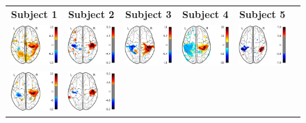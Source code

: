 \begin{figure}[hb]
\scriptsize
\hspace{-4ex}
\begin{tabular}{cccccl}
\textbf{\Large Subject 1} & \textbf{\Large Subject 2} & \textbf{\Large Subject 3} & \textbf{\Large Subject 4} & \textbf{\Large Subject 5} & {}\\
{\includegraphics[width=.14\linewidth]{figures/part_II/press_vis_01.pdf}}
\hspace{1ex}
&{\includegraphics[width=.14\linewidth]{figures/part_II/press_vis_03.pdf}}
\hspace{1ex}
&{\includegraphics[width=.14\linewidth]{figures/part_II/press_vis_04.pdf}}
\hspace{1ex}
&{\includegraphics[width=.14\linewidth]{figures/part_II/press_vis_05.pdf}}
\hspace{1ex}
&{\includegraphics[width=.14\linewidth]{figures/part_II/press_vis_06.pdf}}
\hspace{1ex}
& {} \\
{\includegraphics[width=.14\linewidth]{figures/part_II/press_aud_01.pdf}}
\hspace{1ex}
&{\includegraphics[width=.14\linewidth]{figures/part_II/press_aud_03.pdf}}

\end{tabular}
\end{figure}
